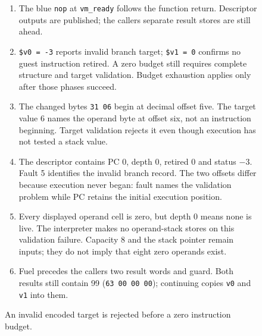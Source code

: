 \begin{figure}[htbp]
  \par\smallskip
  \begin{minipage}{\linewidth}
    \small
    \begin{enumerate}
      \setlength{\itemsep}{2pt}
            \setlength{\parsep}{0pt}
      \item The blue \texttt{nop} at \texttt{vm\_ready} follows the function return. Descriptor outputs are published; the caller\textquotesingle s separate result stores are still ahead.
      \item \texttt{\$v0 = -3} reports invalid branch target; \texttt{\$v1 = 0} confirms no guest instruction retired. A zero budget still requires complete structure and target validation. Budget exhaustion applies only after those phases succeed.
      \item The changed bytes \texttt{31 06} begin at decimal offset five. The target value 6 names the operand byte at offset six, not an instruction beginning. Target validation rejects it even though execution has not tested a stack value.
      \item The descriptor contains PC 0, depth 0, retired 0 and status $-3$. Fault 5 identifies the invalid branch record. The two offsets differ because execution never began: fault names the validation problem while PC retains the initial execution position.
      \item Every displayed operand cell is zero, but depth 0 means none is live. The interpreter makes no operand-stack stores on this validation failure. Capacity 8 and the stack pointer remain inputs; they do not imply that eight zero operands exist.
      \item Fuel precedes the caller\textquotesingle s two result words and guard. Both results still contain 99 (\texttt{63 00 00 00}); continuing copies \texttt{v0} and \texttt{v1} into them.
    \end{enumerate}
  \end{minipage}
  \caption{An invalid encoded target is rejected before a zero instruction budget.}
  \label{capture:018-tiny-bytecode-interpreter-f04}
  \label{vm-f04}
\end{figure}
\par
